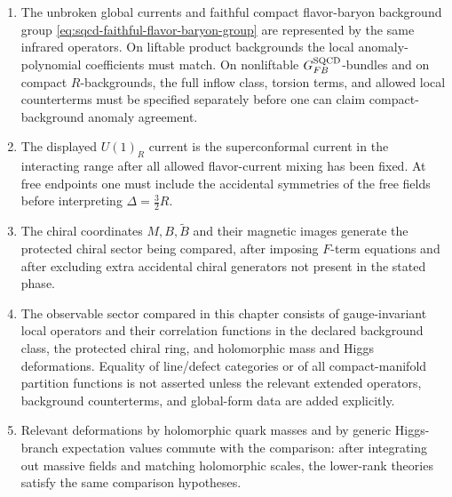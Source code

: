 \begin{hypothesis}
\begin{enumerate}
  \(p/\Lambda_{\rm el}\) tending to zero.  A subsequent
  \(\Lambda_{\rm el}\to\infty\) statement is admitted only for observables
  whose low-energy limits are explicitly declared independent of the electric
  ultraviolet completion; in this chapter those are the protected chiral
  ring, local current-anomaly coefficients in the declared background class,
  and holomorphic mass/Higgs deformation ledgers.
\item The unbroken global currents and faithful compact flavor-baryon
  background group \eqref{eq:sqcd-faithful-flavor-baryon-group} are
  represented by the same infrared operators.  On liftable product
  backgrounds the local anomaly-polynomial coefficients must match.  On
  nonliftable \(G_{FB}^{\rm SQCD}\)-bundles and on compact \(R\)-backgrounds,
  the full inflow class, torsion terms, and allowed local counterterms must be
  specified separately before one can claim compact-background anomaly
  agreement.
\item The displayed \(U(1)_R\) current is the superconformal current in the
  interacting range after all allowed flavor-current mixing has been fixed.
  At free endpoints one must include the accidental symmetries of the free
  fields before interpreting \(\Delta=\frac32R\).
\item The chiral coordinates \(M,B,\widetilde B\) and their magnetic images
  generate the protected chiral sector being compared, after imposing
  \(F\)-term equations and after excluding extra accidental chiral generators
  not present in the stated phase.
\item The observable sector compared in this chapter consists of
  gauge-invariant local operators and their correlation functions in the
  declared background class, the protected chiral ring, and holomorphic mass
  and Higgs deformations.  Equality of line/defect categories or of all
  compact-manifold partition functions is not asserted unless the relevant
  extended operators, background counterterms, and global-form data are added
  explicitly.
\item Relevant deformations by holomorphic quark masses and by generic
  Higgs-branch expectation values commute with the comparison: after
  integrating out massive fields and matching holomorphic scales, the
  lower-rank theories satisfy the same comparison hypotheses.
\end{enumerate}
\end{hypothesis}

